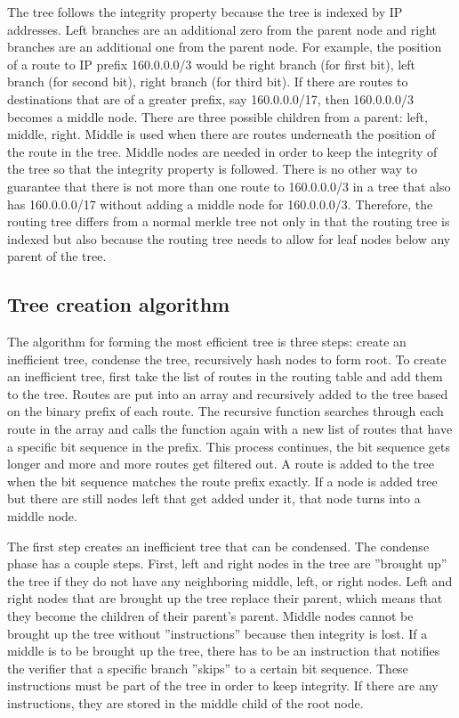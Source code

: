\documentclass[letterpaper, 10 pt, conference]{ieeeconf}  %
\begin{document}
The tree follows the integrity property because the tree is indexed by IP addresses. Left branches are an additional zero from the parent node and right branches are an additional one from the parent node. For example, the position of a route to IP prefix 160.0.0.0/3 would be right branch (for first bit), left branch (for second bit), right branch (for third bit). If there are routes to destinations that are of a greater prefix, say 160.0.0.0/17, then 160.0.0.0/3 becomes a middle node. There are three possible children from a parent: left, middle, right. Middle is used when there are routes underneath the position of the route in the tree. Middle nodes are needed in order to keep the integrity of the tree so that the integrity property is followed. There is no other way to guarantee that there is not more than one route to 160.0.0.0/3 in a tree that also has 160.0.0.0/17 without adding a middle node for 160.0.0.0/3. Therefore, the routing tree differs from a normal merkle tree not only in that the routing tree is indexed but also because the routing tree needs to allow for leaf nodes below any parent of the tree. 

\subsection{Tree creation algorithm}

The algorithm for forming the most efficient tree is three steps: create an inefficient tree, condense the tree, recursively hash nodes to form root. To create an inefficient tree, first take the list of routes in the routing table and add them to the tree. Routes are put into an array and recursively added to the tree based on the binary prefix of each route. The recursive function searches through each route in the array and calls the function again with a new list of routes that have a specific bit sequence in the prefix. This process continues, the bit sequence gets longer and more and more routes get filtered out. A route is added to the tree when the bit sequence matches the route prefix exactly. If a node is added tree but there are still nodes left that get added under it, that node turns into a middle node. 

The first step creates an inefficient tree that can be condensed. The condense phase has a couple steps. First, left and right nodes in the tree are ”brought up” the tree if they do not have any neighboring middle, left, or right nodes. Left and right nodes that are brought up the tree replace their parent, which means that they become the children of their parent’s parent. Middle nodes cannot be brought up the tree without ”instructions” because then integrity is lost. If a middle is to be brought up the tree, there has to be an instruction that notifies the verifier that a specific branch ”skips” to a certain bit sequence. These instructions must be part of the tree in order to keep integrity. If there are any instructions, they are stored in the middle child of the root node. 
\end{document}
